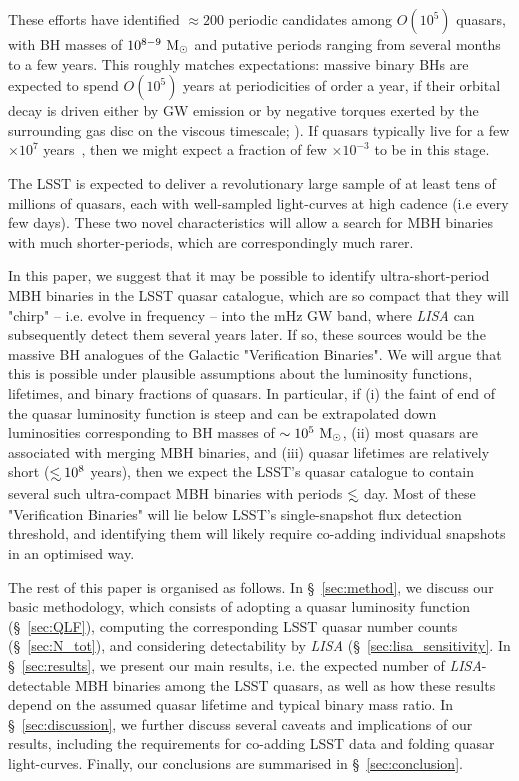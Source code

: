 \documentclass[fleqn,usenatbib]{mnras}
\newcommand\lsim{\mathrel{\rlap{\lower4pt\hbox{\hskip1pt$\sim$}}
        \raise1pt\hbox{$<$}}}
\begin{document}
These efforts have identified $\approx200$ periodic candidates among $O(10^5)$ quasars, with BH masses of $10^{8-9}~{\rm M_\odot}$ and putative periods ranging from several months to a few years.  This roughly matches expectations: massive binary BHs are expected to spend $O(10^5)$ years at periodicities of order a year, if their orbital decay is driven either by GW emission or by negative torques exerted by the surrounding gas disc on the viscous timescale; \citealt{Haiman2009a}). If quasars typically live for a few  $\times 10^7$ years~\citep{MartiniSchneider2004}, then we might expect a fraction of few $\times 10^{-3}$ to be in this stage.

The LSST is expected to deliver a revolutionary large sample of at least tens of millions of quasars, each with well-sampled light-curves at high cadence (i.e every few days). These two novel characteristics will allow a search for MBH binaries with much shorter-periods, which are correspondingly much rarer.

In this paper, we suggest that it may be possible to identify ultra-short-period MBH binaries in the LSST quasar catalogue, which are so compact that they will "chirp" -- i.e. evolve in frequency -- into the mHz GW band, where {\it LISA} can subsequently detect them several years later.   If so, these sources would be the massive BH analogues of the Galactic "Verification Binaries".  We will argue that this is possible under plausible assumptions
about the luminosity functions, lifetimes, and binary fractions of quasars.    In particular, if (i) the faint of end of the quasar luminosity function is steep and can be extrapolated down luminosities corresponding to BH masses of $\sim 10^5~{\rm M_\odot}$, (ii)  most quasars are associated with merging MBH binaries, and (iii) quasar lifetimes are relatively short ($\lsim 10^8$ years), then we expect the LSST's quasar catalogue to contain several such ultra-compact MBH binaries with periods $\lsim$ day.
Most of these "Verification Binaries" will lie below LSST's single-snapshot flux detection threshold, and identifying them will likely require co-adding individual snapshots in an optimised way.

The rest of this paper is organised as follows. 
%
In \S~\ref{sec:method}, we discuss our basic methodology, which consists of adopting a quasar luminosity function (\S~\ref{sec:QLF}), computing the corresponding LSST quasar number counts (\S~\ref{sec:N_tot}), and considering detectability by {\it LISA} (\S~\ref{sec:lisa_sensitivity}.
%
In \S~\ref{sec:results}, we present our main results, i.e. the expected number of {\it LISA}-detectable MBH binaries among the LSST quasars, as well as how these results depend on the assumed quasar lifetime and typical binary mass ratio.
%
In \S~\ref{sec:discussion}, we further discuss several caveats and implications of our results, including the requirements for co-adding LSST data and folding quasar light-curves.
%
Finally, our conclusions are summarised in \S~\ref{sec:conclusion}.
\end{document}
